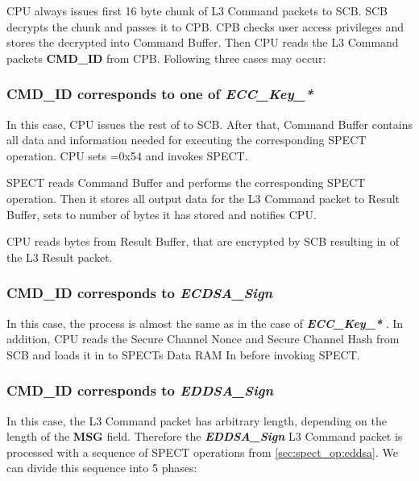 \documentclass[notconfidential]{tropic_design_spec}
\def\LLLCMD{L3 Command packet}
\def\LLLRES{L3 Result packet}
\newcommand{\TsApiCmd}[1]{%
\mbox{\textit{\textbf{#1}}}%
}
\newcommand{\TsApiCmdFld}[1]{%
\mbox{\textbf{#1}}%
}
\begin{document}
CPU always issues first 16 byte chunk of \LLLCMD{}s  to SCB. SCB decrypts the chunk and passes
it to CPB. CPB checks user access privileges and stores the decrypted  into
Command Buffer. Then CPU reads the \LLLCMD{}s \TsApiCmdFld{CMD_ID} from CPB. Following three cases may occur:

\subsubsection*{\TsApiCmdFld{CMD_ID} corresponds to one of \TsApiCmd{ECC_Key_*}}

In this case, CPU issues the rest of  to SCB. After that, Command Buffer contains all data
and information needed for executing the corresponding \linebreak SPECT operation. CPU sets
=0x54 and invokes SPECT.

SPECT reads Command Buffer and performs the corresponding SPECT operation. Then it stores all output
data for the \LLLCMD{} to Result Buffer, sets \linebreak {} to number of bytes
it has stored and notifies CPU.

CPU reads  bytes from Result Buffer, that are encrypted by SCB resulting
in  of the \LLLRES{}.

\subsubsection*{\TsApiCmdFld{CMD_ID} corresponds to \TsApiCmd{ECDSA_Sign}}

In this case, the process is almost the same as in the case of \TsApiCmd{ECC_Key_*}. In addition, CPU reads
the Secure Channel Nonce and Secure Channel Hash from SCB and loads it in to SPECTs Data RAM In before
invoking SPECT.

\subsubsection*{\TsApiCmdFld{CMD_ID} corresponds to \TsApiCmd{EDDSA_Sign}}

In this case, the \LLLCMD{} has arbitrary length, depending on the length of the \TsApiCmdFld{MSG} field.
Therefore the \TsApiCmd{EDDSA_Sign} \LLLCMD{} is processed with a sequence of SPECT operations from
\ref{sec:spect_op:eddsa}. We can divide this sequence into 5 phases:
\end{document}
